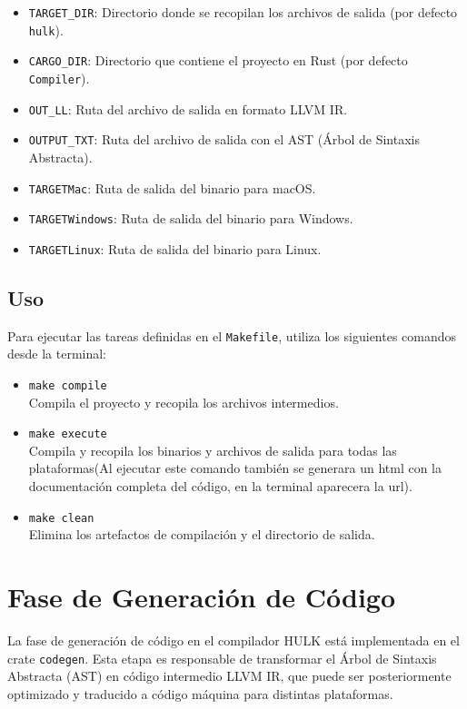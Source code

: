 \documentclass[a4paper, 12pt]{article}
\begin{document}
\begin{itemize}
  \item \texttt{TARGET\_DIR}: Directorio donde se recopilan los archivos de salida (por defecto \texttt{hulk}).
  \item \texttt{CARGO\_DIR}: Directorio que contiene el proyecto en Rust (por defecto \texttt{Compiler}).
  \item \texttt{OUT\_LL}: Ruta del archivo de salida en formato LLVM IR.
  \item \texttt{OUTPUT\_TXT}: Ruta del archivo de salida con el AST (Árbol de Sintaxis Abstracta).
  \item \texttt{TARGETMac}: Ruta de salida del binario para macOS.
  \item \texttt{TARGETWindows}: Ruta de salida del binario para Windows.
  \item \texttt{TARGETLinux}: Ruta de salida del binario para Linux.
\end{itemize}

\subsection{Uso}

Para ejecutar las tareas definidas en el \texttt{Makefile}, utiliza los siguientes comandos desde la terminal:

\begin{itemize}
  \item \texttt{make compile} \hfill \\
        Compila el proyecto y recopila los archivos intermedios.
  \item \texttt{make execute} \hfill \\
        Compila y recopila los binarios y archivos de salida para todas las plataformas(Al ejecutar este comando también se generara un html con la documentación completa del código, en la terminal aparecera la url).
  \item \texttt{make clean} \hfill \\
        Elimina los artefactos de compilación y el directorio de salida.
\end{itemize}

\section{Fase de Generación de Código}

La fase de generación de código en el compilador HULK está implementada en el crate \texttt{codegen}. Esta etapa es responsable de transformar el Árbol de Sintaxis Abstracta (AST) en código intermedio LLVM IR, que puede ser posteriormente optimizado y traducido a código máquina para distintas plataformas.
\end{document}
